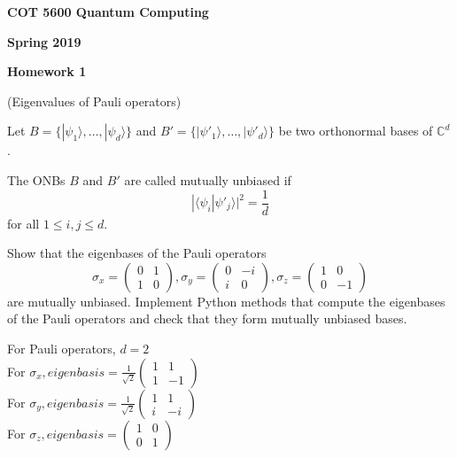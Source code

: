 \documentclass[12pt]{article}
\renewcommand{\>}{\rangle}
\newcommand{\<}{\langle}
\newcommand{\C}{\mathbb{C}}
\begin{document}
\begin{center}
{\bf COT 5600 Quantum Computing} 

\medskip
{\bf Spring 2019}

\bigskip

{\bf Homework 1}
\end{center}

\newpage


 (Eigenvalues of Pauli operators)

\medskip
\noindent
Let $B=\{|\psi_1\>,\ldots,|\psi_d\>\}$ and $B'=\{|\psi'_1\>,\ldots,|\psi'_d\>\}$ be two orthonormal bases of $\C^d$. 

The ONBs $B$ and $B'$ are called mutually unbiased if 
\[
|\< \psi_i | \psi'_j \>|^2 = \frac{1}{d} 
\]
for all $1\le i,j \le d$.

Show that the eigenbases of the Pauli operators 
\[
\sigma_x = 
\left(
\begin{array}{cc}
0 & 1 \\
1 & 0
\end{array}
\right),
%
\sigma_y = 
\left(
\begin{array}{cc}
0 & -i \\
i & 0
\end{array}
\right),
%
\sigma_z = 
\left(
\begin{array}{cc}
1 & 0 \\
0 & -1
\end{array}
\right)
\]
are mutually unbiased. Implement Python methods that compute the eigenbases of the Pauli operators and check that they form mutually unbiased bases. 

\begin{flushleft}
\noindent

For Pauli operators, $d = 2$ \\
For $\sigma_x, eigenbasis = \frac{1}{\sqrt 2} \left(
\begin{array}{cc}
1 & 1 \\
1 & -1
\end{array}
\right)$ \\

For $\sigma_y, eigenbasis = \frac{1}{\sqrt 2} \left(
\begin{array}{cc}
1 & 1 \\
i & -i
\end{array}
\right)$ \\

For $\sigma_z, eigenbasis =  \left(
\begin{array}{cc}
1 & 0 \\
0 & 1
\end{array}
\right)$ \\
\end{flushleft}
\end{document}
